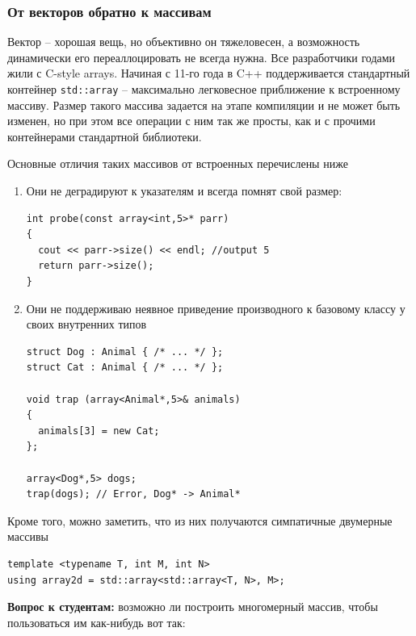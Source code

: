 \documentclass[a4paper,12pt,oneside]{article}
\begin{document}
\subsubsection{От векторов обратно к массивам}

Вектор -- хорошая вещь, но объективно он тяжеловесен, а возможность динамически его переаллоцировать не всегда нужна. Все разработчики годами жили с C-style arrays. Начиная с 11-го года в C++ поддерживается стандартный контейнер \lstinline!std::array! -- максимально легковесное приближение к встроенному массиву. Размер такого массива задается на этапе компиляции и не может быть изменен, но при этом все операции с ним так же просты, как и с прочими контейнерами стандартной библиотеки.

Основные отличия таких массивов от встроенных перечислены ниже

\begin{enumerate}

\item
Они не деградируют к указателям и всегда помнят свой размер:

\begin{lstlisting}
int probe(const array<int,5>* parr) 
{ 
  cout << parr->size() << endl; //output 5 
  return parr->size(); 
}
\end{lstlisting}

\item
Они не поддерживаю неявное приведение производного к базовому классу у своих внутренних типов

\begin{lstlisting}
struct Dog : Animal { /* ... */ }; 
struct Cat : Animal { /* ... */ }; 

void trap (array<Animal*,5>& animals) 
{ 
  animals[3] = new Cat; 
}; 

array<Dog*,5> dogs;
trap(dogs); // Error, Dog* -> Animal*
\end{lstlisting}

\end{enumerate}

Кроме того, можно заметить, что из них получаются симпатичные двумерные массивы

\begin{lstlisting}
template <typename T, int M, int N> 
using array2d = std::array<std::array<T, N>, M>; 
\end{lstlisting}

\textbf{Вопрос к студентам:} возможно ли построить многомерный массив, чтобы пользоваться им как-нибудь вот так:
\end{document}
